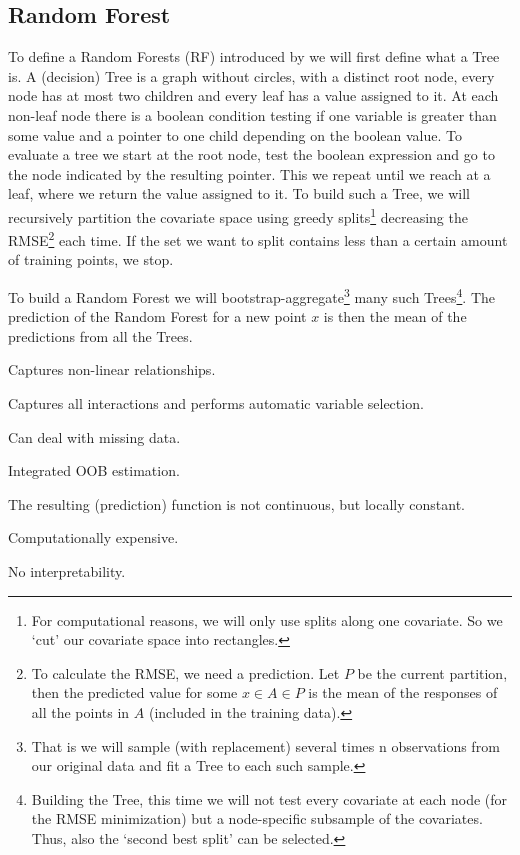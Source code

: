 \subsection{Random Forest}{\label{sec:corr_model_RF}
    To define a Random Forests (RF) introduced by \cite{breimanRandomForests2001}  we will first define what a Tree is. A {(decision) Tree} is a graph without circles, with a distinct root node, every node has at most two children and every leaf has a value assigned to it. At each non-leaf node there is a boolean condition testing if one variable is greater than some value and a pointer to one child depending on the boolean value. To evaluate a tree we start at the root node, test the boolean expression and go to the node indicated by the resulting pointer. This we repeat until we reach at a leaf, where we return the value assigned to it. 
    To build such a Tree, we will recursively partition the covariate space using greedy splits\footnote{For computational reasons, we will only use splits along one covariate. So we `cut' our covariate space into rectangles.} decreasing the RMSE\footnote{To calculate the RMSE, we need a prediction. Let $P$ be the current partition, then the predicted value for some $x\in A \in P$ is the mean of the responses of all the points in $A$ (included in the training data).} each time. If the set we want to split contains less than a certain amount of training points, we stop.
    
    To build a {Random Forest} we will bootstrap-aggregate\footnote{That is we will sample (with replacement) several times n observations from our original data and fit a Tree to each such sample.} many such Trees\footnote{Building the Tree, this time we will not test every covariate at each node (for the RMSE minimization) but a node-specific subsample of the covariates. Thus, also the `second best split' can be selected.}. The prediction of the Random Forest for a new point $x$ is then the mean of the predictions from all the Trees. 
    \begin{my_pros_cons_table}{
        \item Captures non-linear relationships.
        \item Captures all interactions and performs automatic variable selection.
        \item Can deal with missing data.
        \item Integrated OOB estimation.\footnotemark
    }{
        \item The resulting (prediction) function is not continuous, but locally constant.
        \item Computationally expensive.
        \item No interpretability.
    }
    \end{my_pros_cons_table}
}
